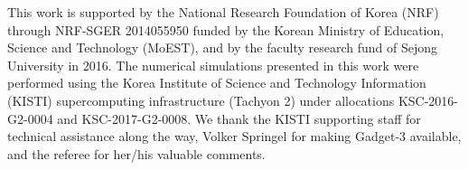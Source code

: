 \documentclass{emulateapj}
\begin{document}


\begin{acknowledgements}

This work is supported by the National Research Foundation of Korea (NRF) through NRF-SGER 2014055950 funded by the Korean Ministry of Education, Science and Technology (MoEST), and by the faculty research fund of Sejong University in 2016. 
The numerical simulations presented in this work were performed using the Korea Institute of Science and Technology Information (KISTI) supercomputing infrastructure (Tachyon 2) under allocations KSC-2016-G2-0004 and KSC-2017-G2-0008. 
We thank the KISTI supporting staff for technical assistance along the way, 
Volker Springel for making Gadget-3 available, and the referee for her/his valuable comments.

\end{acknowledgements}
  

\end{document}
